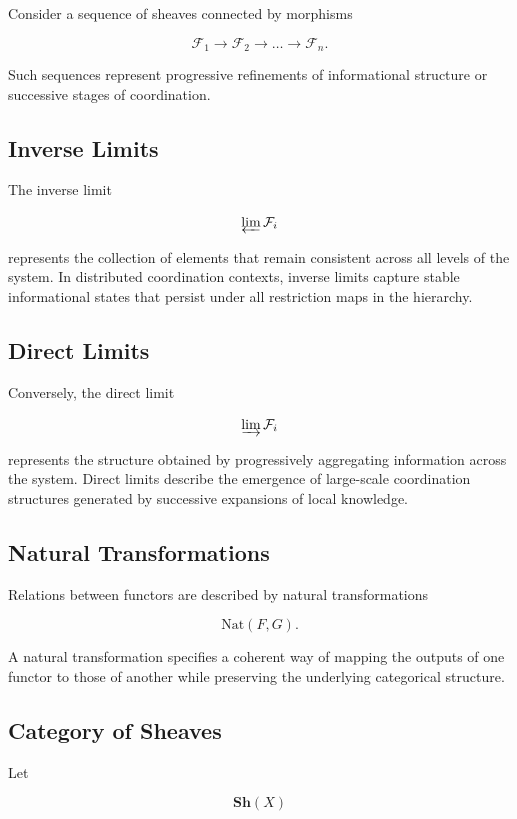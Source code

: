 \documentclass[12pt]{article}
\begin{document}
Consider a sequence of sheaves connected by morphisms

\[
\mathcal{F}_1 \rightarrow \mathcal{F}_2 \rightarrow \dots \rightarrow \mathcal{F}_n.
\]

Such sequences represent progressive refinements of informational structure or successive stages of coordination.

\subsection{Inverse Limits}

The inverse limit

\[
\varprojlim \mathcal{F}_i
\]

represents the collection of elements that remain consistent across all levels of the system. In distributed coordination contexts, inverse limits capture stable informational states that persist under all restriction maps in the hierarchy.

\subsection{Direct Limits}

Conversely, the direct limit

\[
\varinjlim \mathcal{F}_i
\]

represents the structure obtained by progressively aggregating information across the system. Direct limits describe the emergence of large-scale coordination structures generated by successive expansions of local knowledge.

\subsection{Natural Transformations}

Relations between functors are described by natural transformations

\[
\mathrm{Nat}(F,G).
\]

A natural transformation specifies a coherent way of mapping the outputs of one functor to those of another while preserving the underlying categorical structure.

\subsection{Category of Sheaves}

Let

\[
\mathbf{Sh}(X)
\]
\end{document}
